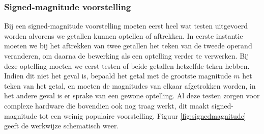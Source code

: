 \subsubsection{Signed-magnitude voorstelling}
Bij een signed-magnitude voorstelling moeten eerst heel wat testen uitgevoerd worden alvorens we getallen kunnen optellen of aftrekken. In eerste instantie moeten we bij het aftrekken van twee getallen het teken van de tweede operand veranderen, om daarna de bewerking als een optelling verder te verwerken. Bij deze optelling moeten we eerst testen of beide getallen hetzelfde teken hebben. Indien dit niet het geval is, bepaald het getal met de grootste magnitude $m$ het teken van het getal, en moeten de magnitudes van elkaar afgetrokken worden, in het andere geval is er sprake van een gewone optelling. Al deze testen zorgen voor complexe hardware die bovendien ook nog traag werkt, dit maakt signed-magnitude tot een weinig populaire voorstelling. Figuur \ref{fig:signedmagnitude} geeft de werkwijze schematisch weer.

